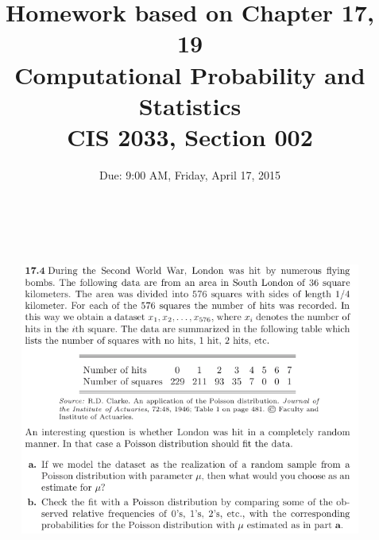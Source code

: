 \documentclass{article} %
\title{Homework based on Chapter 17, 19\\
Computational Probability and Statistics \\
CIS 2033, Section 002}
\author{Due: 9:00 AM, Friday, April 17, 2015}
\begin{document}
\maketitle

\begin{figure}[h!]
\centering
\includegraphics[width=5.5in, height=4.5in]{1.png}
\end{figure}

%
\end{document}
